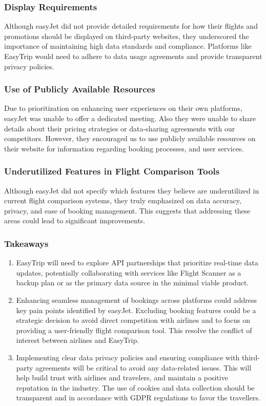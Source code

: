 \subsubsection{Display Requirements}
Although easyJet did not provide detailed requirements for how their flights and promotions should be displayed on third-party websites, they underscored the importance of maintaining high data standards and compliance. Platforms like EasyTrip would need to adhere to data usage agreements and provide transparent privacy policies.

\subsubsection{Use of Publicly Available Resources}
Due to prioritization on enhancing user experiences on their own platforms, easyJet was unable to offer a dedicated meeting. Also they were unable to share details about their pricing strategies or data-sharing agreements with our competitors. However, they encouraged us to use publicly available resources on their website for information regarding booking processes, and user services.

\subsubsection{Underutilized Features in Flight Comparison Tools}
Although easyJet did not specify which features they believe are underutilized in current flight comparison systems, they truly emphasized on data accuracy, privacy, and ease of booking management. This suggests that addressing these areas could lead to significant improvements.

\subsubsection{Takeaways}
\begin{enumerate}
    \item EasyTrip will need to explore API partnerships that prioritize real-time data updates, potentially collaborating with services like Flight Scanner as a backup plan or as the primary data source in the minimal viable product.
    \item Enhancing seamless management of bookings across platforms could address key pain points identified by easyJet. Excluding booking features could be a strategic decision to avoid direct competition with airlines and to focus on providing a user-friendly flight comparison tool. This resolve the conflict of interest between airlines and EasyTrip.
    \item Implementing clear data privacy policies and ensuring compliance with third-party agreements will be critical to avoid any data-related issues. This will help build trust with airlines and travelers, and maintain a positive reputation in the industry. The use of cookies and data collection should be transparent and in accordance with GDPR regulations to favor the travellers.
\end{enumerate}